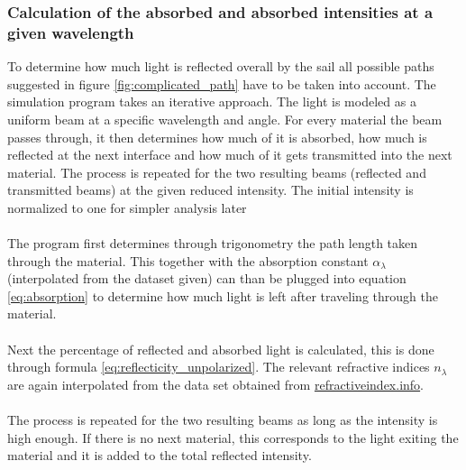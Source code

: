 \documentclass[14pt]{article}
\begin{document}
\subsubsection{Calculation of the absorbed and absorbed intensities at a given wavelength}
To determine how much light is reflected overall by the sail all possible paths suggested in figure \ref{fig:complicated_path}
have to be taken into account. The simulation program takes an iterative approach. The light is modeled as a uniform beam at a
specific wavelength and angle. For every material the beam passes through, it then determines how much of it is absorbed, how much
is reflected at the next interface and how much of it gets transmitted into the next material. The process is repeated
for the two resulting beams (reflected and transmitted beams) at the given reduced intensity. The initial intensity is normalized
to one for simpler analysis later\\
\\
The program first determines through trigonometry the path length taken through the material. This together
with the absorption constant $\alpha_{\lambda}$ (interpolated from the dataset given) can than be plugged into
equation \ref{eq:absorption} to determine how much light is left after traveling through the material.\\
\\
Next the percentage of reflected and absorbed light is calculated, this is done through formula \ref{eq:reflecticity_unpolarized}.
The relevant refractive indices $n_{\lambda}$ are again interpolated from the data set obtained from \hyperref{https://refractiveindex.info}{}{}{refractiveindex.info}\autocite{polyanskiy}.\\
\\
The process is repeated for the two resulting beams as long as the intensity is high enough. If there is no next material, this
corresponds to the light exiting the material and it is added to the total reflected intensity.\\
\end{document}
